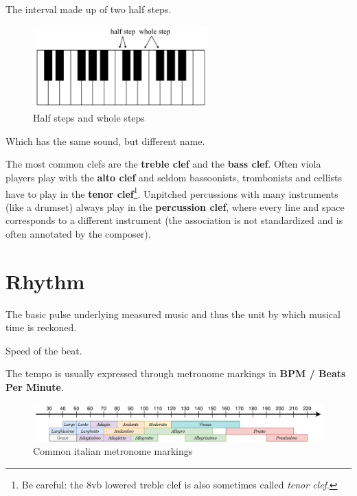 \begin{definition}
    The interval made up of two half steps.
\end{definition}

\begin{figure}[h]
    \begin{center}
        \includegraphics[width=0.6\textwidth]{img/halfstep}
        \caption{Half steps and whole steps}
    \end{center}
\end{figure}

\begin{definition}[Enharmonic]
    Which has the same sound, but different name.
\end{definition}

The most common clefs are the \textbf{treble clef} and the \textbf{bass clef}. Often viola players play with the \textbf{alto clef} and seldom bassoonists, trombonists and cellists have to play in the \textbf{tenor clef}\footnote{Be careful: the 8vb lowered treble clef is also sometimes called \emph{tenor clef}.}. Unpitched percussions with many instruments (like a drumset) always play in the \textbf{percussion clef}, where every line and space corresponds to a different instrument (the association is not standardized and is often annotated by the composer).

\section{Rhythm}
\begin{definition}
    The basic pulse underlying measured music and thus the unit by which musical time is reckoned.
\end{definition}

\begin{definition}[Tempo]
    Speed of the beat.
\end{definition}
The tempo is usually expressed through metronome markings in \textbf{BPM / Beats Per Minute}.

\begin{figure}[h]
    \begin{center}
        \includegraphics[width=\textwidth]{img/timeline-tempo}
        \caption{Common italian metronome markings}
    \end{center}
\end{figure}

